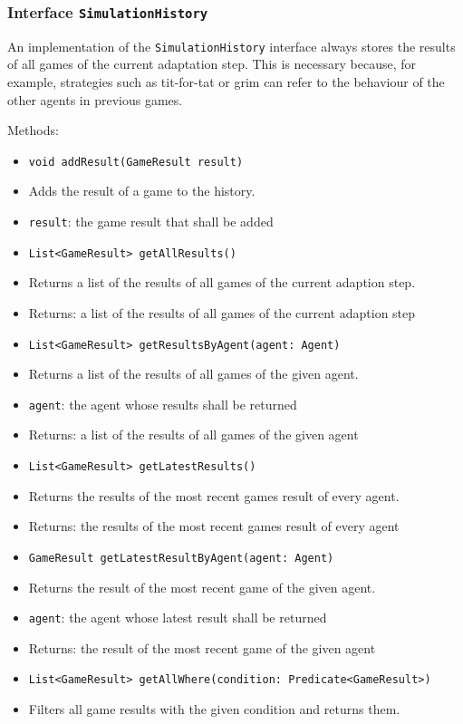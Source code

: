 \documentclass[parskip=full,11pt]{scrartcl}
\begin{document}
\subsubsection{Interface \texttt{SimulationHistory}}
An implementation of the \texttt{SimulationHistory} interface always stores the results of all games of the current adaptation step. This is necessary because, for example, strategies such as tit-for-tat or grim can refer to the behaviour of the other agents in previous games.

Methods:
\begin{itemize}\itemsep -10pt
	\item \texttt{void addResult(GameResult result)}
	\item[] Adds the result of a game to the history.
	\item[] \texttt{result}: the game result that shall be added
	\item \texttt{List<GameResult> getAllResults()}
	\item[] Returns a list of the results of all games of the current adaption step.
	\item[]Returns: a list of the results of all games of the current adaption step
	\item \texttt{List<GameResult> getResultsByAgent(agent: Agent)}
	\item[] Returns a list of the results of all games of the given agent.
	\item[] \texttt{agent}: the agent whose results shall be returned
	\item[]Returns: a list of the results of all games of the given agent
	\item \texttt{List<GameResult> getLatestResults()}
	\item[] Returns the results of the most recent games result of every agent.
	\item[]Returns: the results of the most recent games result of every agent
	\item \texttt{GameResult getLatestResultByAgent(agent: Agent)}
	\item[] Returns the result of the most recent game of the given agent.
	\item[] \texttt{agent}: the agent whose latest result shall be returned
	\item[]Returns: the result of the most recent game of the given agent
	\item \texttt{List<GameResult> getAllWhere(condition: Predicate<GameResult>)}
	\item[] Filters all game results with the given condition and returns them.

\end{itemize}
\end{document}
